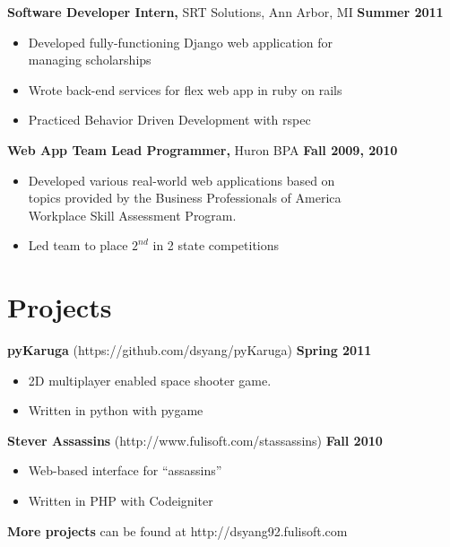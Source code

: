 \documentclass[sectioned]{dsyangres}
\begin{document}
\begin{resume}
\textbf{Software Developer Intern,}
  SRT Solutions, Ann Arbor, MI \hfill \textbf{Summer 2011}

  \begin{itemize} \itemsep -2pt
    \item Developed fully-functioning Django web application for\\
      managing scholarships
    \item Wrote back-end services for flex web app in ruby
      on rails
    \item Practiced Behavior Driven Development with rspec
  \end{itemize}

\textbf{Web App Team Lead Programmer, }
  Huron BPA \hfill \textbf{Fall 2009, 2010}
  \begin{itemize} \itemsep -2pt %
    \item Developed various real-world web applications based on\\
      topics provided by the Business Professionals of America \\
      Workplace Skill Assessment Program.
    \item Led team to place $2^{nd}$ in 2 state competitions
  \end{itemize}



\section{Projects}

\textbf{pyKaruga} (https://github.com/dsyang/pyKaruga) \hfill \textbf{Spring 2011}
  \begin{itemize} \itemsep -2pt
    \item 2D multiplayer enabled space shooter game.
    \item Written in python with pygame
  \end{itemize}

\textbf{Stever Assassins} (http://www.fulisoft.com/stassassins)
 \hfill \textbf{Fall 2010}
  \begin{itemize} \itemsep -2pt
    \item Web-based interface for ``assassins''
    \item Written in PHP with Codeigniter
  \end{itemize}
\vspace{-1pt}
\textbf{More projects} can be found at http://dsyang92.fulisoft.com




\end{resume}
\end{document}
